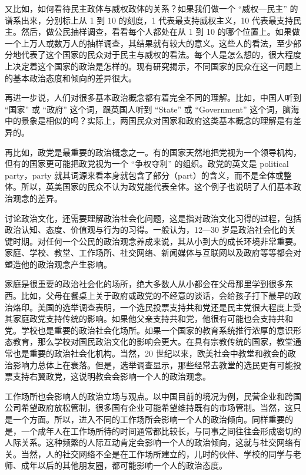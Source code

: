 又比如，如何看待民主政体与威权政体的关系？如果我们做一个 “威权—民主” 的谱系出来，分别标上从 1 到 10 的刻度，1 代表最支持威权主义，10 代表最支持民主。然后，做公民抽样调查，看看每个人都处在从 1 到 10 的哪个位置上。如果做一个上万人或数万人的抽样调查，其结果就有较大的意义。这些人的看法，至少部分地代表了这个国家的民众对于民主与威权的看法。每个人是怎么想的，很大程度上决定着这个国家的政治是怎样的。现有研究揭示，不同国家的民众在这一问题上的基本政治态度和倾向的差异很大。

再进一步说，人们对很多基本政治概念都有着完全不同的理解。比如，中国人听到 “国家” 或 “政府” 这个词，跟英国人听到 “State” 或 “Government” 这个词，脑海中的景象是相似的吗？实际上，两国民众对国家和政府这类基本概念的理解是有差异的。

再比如，政党是最重要的政治概念之一。有的国家天然地把党视为一个领导机构，但有的国家更可能把政党视为一个 “争权夺利” 的组织。政党的英文是 political party，party 就其词源来看本身就包含了部分（part）的含义，而不是全体或整体。所以，英美国家的民众不认为政党能代表全体。这个例子也说明了人们基本政治观念的差异。

讨论政治文化，还需要理解政治社会化问题，这是指对政治文化习得的过程，包括政治认知、态度、价值观与行为的习得。一般认为，12—30 岁是政治社会化的关键时期。对任何一个公民的政治观念养成来说，其从小到大的成长环境非常重要。家庭、学校、教堂、工作场所、社交网络、新闻媒体与互联网以及政府等等都会对塑造他的政治观念产生影响。

家庭是很重要的政治社会化的场所，绝大多数人从小都会在父母那里学到很多东西。比如，父母在餐桌上关于政府或政党的不经意的谈话，会给孩子打下最早的政治烙印。美国的选举调查表明，一个选民投票支持共和党还是民主党很大程度上受其家庭政党支持传统的影响。如果他父亲支持共和党，他很有可能也会支持共和党。学校也是重要的政治社会化场所。如果一个国家的教育系统推行浓厚的意识形态教育，那么学校对国民政治文化的影响会更大。在具有宗教传统的国家，教堂通常也是重要的政治社会化机构。当然，20 世纪以来，欧美社会中教堂和教会的政治影响力总体上在衰落。但是，选举调查显示，那些经常去教堂的选民更有可能投票支持右翼政党，这说明教会会影响一个人的政治观念。

工作场所也会影响人的政治立场与观点。以中国目前的境况为例，民营企业和跨国公司希望政府放松管制，很多国有企业可能希望维持既有的市场管制。当然，这只是一个方面。所以，进入不同的工作场所会影响一个人的政治倾向。同样重要的是，一个成年人在工作场所待的时间通常都比较长，与同事之间往往会形成密切的人际关系。这种频繁的人际互动肯定会影响一个人的政治倾向，这就与社交网络有关。当然，人的社交网络不全是在工作场所建立的，儿时的伙伴、学校的同学与老师、成年以后的其他朋友圈，都可能影响一个人的政治态度。

